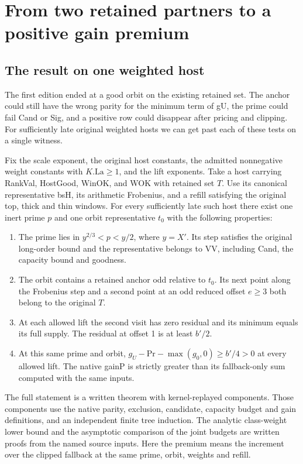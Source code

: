 \documentclass[12pt,letterpaper]{article}
\DeclareRobustCommand{\id}[1]{\mbox{\small\ttfamily #1}}
\begin{document}
\section{From two retained partners to a positive gain premium}
\label{sec:gain-extension}

\subsection{The result on one weighted host}

The first edition ended at a good orbit on the existing retained set. The anchor could still have the wrong parity for the minimum term of \id{gU}, the prime could fail \id{Cand} or \id{Sig}, and a positive row could disappear after pricing and clipping. For sufficiently late original weighted hosts we can get past each of these tests on a single witness.

Fix the scale exponent, the original host constants, the admitted nonnegative weight constants with \(K.\mathrm{La}\ge1\), and the lift exponents. Take a host carrying \id{RankVal}, \id{HostGood}, \id{WinOK}, and \id{WOK} with retained set \(T\). Use its canonical representative \id{bsH}, its arithmetic Frobenius, and a refill satisfying the original top, thick and thin windows. For every sufficiently late such host there exist one inert prime \(p\) and one orbit representative \(t_0\) with the following properties:
\begin{enumerate}[leftmargin=*]
\item The prime lies in \(y^{2/3}<p<y/2\), where \(y=X'\). Its step satisfies the original long-order bound and the representative belongs to \id{VV}, including \id{Cand}, the capacity bound and goodness.
\item The orbit contains a retained anchor odd relative to \(t_0\). Its next point along the Frobenius step and a second point at an odd reduced offset \(e\ge3\) both belong to the original \(T\).
\item At each allowed lift the second visit has zero residual and its minimum equals its full supply. The residual at offset 1 is at least \(b'/2\).
\item At this same prime and orbit, \(g_U-\mathrm{Pr}-\max(g_0,0)\ge b'/4>0\) at every allowed lift. The native \id{gainP} is strictly greater than its fallback-only sum computed with the same inputs.
\end{enumerate}
The full statement is a written theorem with kernel-replayed components. Those components use the native parity, exclusion, candidate, capacity budget and gain definitions, and an independent finite tree induction. The analytic class-weight lower bound and the asymptotic comparison of the joint budgets are written proofs from the named source inputs. Here the premium means the increment over the clipped fallback at the same prime, orbit, weights and refill.
\end{document}
